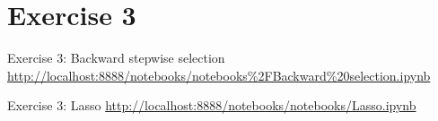 \section{Exercise 3}

\begin{frame}{Exercise 3: Backward stepwise selection}
    \centering
    \vfill
    \tiny{\url{http://localhost:8888/notebooks/notebooks\%2FBackward\%20selection.ipynb}}
    \vfill
\end{frame}

\begin{frame}{Exercise 3: Lasso}
    \centering
    \vfill
    \tiny{\url{http://localhost:8888/notebooks/notebooks/Lasso.ipynb}
    \vfill}
\end{frame}
